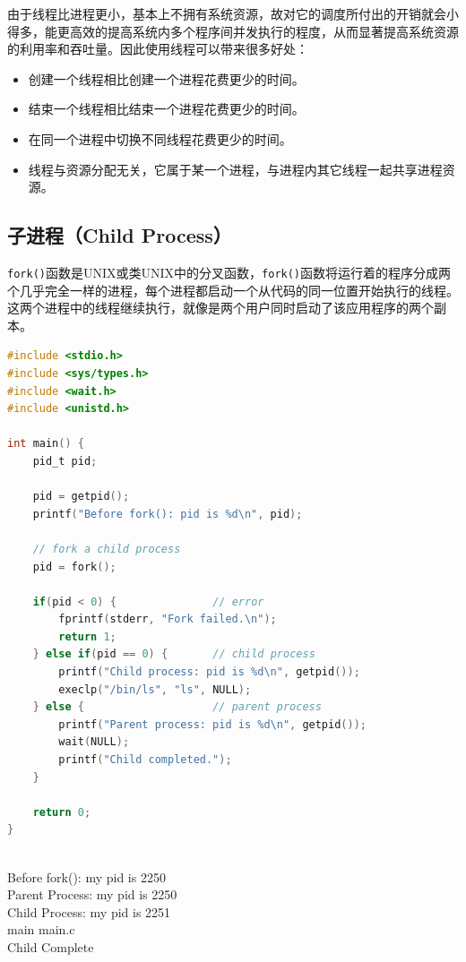 由于线程比进程更小，基本上不拥有系统资源，故对它的调度所付出的开销就会小得多，能更高效的提高系统内多个程序间并发执行的程度，从而显著提高系统资源的利用率和吞吐量。因此使用线程可以带来很多好处：

\begin{itemize}
	\item 创建一个线程相比创建一个进程花费更少的时间。
	\item 结束一个线程相比结束一个进程花费更少的时间。
	\item 在同一个进程中切换不同线程花费更少的时间。
	\item 线程与资源分配无关，它属于某一个进程，与进程内其它线程一起共享进程资源。
\end{itemize}

\subsection{子进程（Child Process）}

\lstinline|fork()|函数是UNIX或类UNIX中的分叉函数，\lstinline|fork()|函数将运行着的程序分成两个几乎完全一样的进程，每个进程都启动一个从代码的同一位置开始执行的线程。这两个进程中的线程继续执行，就像是两个用户同时启动了该应用程序的两个副本。

\begin{lstlisting}[language=C, title=创建子进程]
#include <stdio.h>
#include <sys/types.h>
#include <wait.h>
#include <unistd.h>

int main() {
	pid_t pid;

	pid = getpid();
	printf("Before fork(): pid is %d\n", pid);

	// fork a child process
	pid = fork();

	if(pid < 0) {               // error
		fprintf(stderr, "Fork failed.\n");
		return 1;
	} else if(pid == 0) {       // child process
		printf("Child process: pid is %d\n", getpid());
		execlp("/bin/ls", "ls", NULL);
	} else {                    // parent process
		printf("Parent process: pid is %d\n", getpid());
		wait(NULL);
		printf("Child completed.");
	}
	
	return 0;
}
\end{lstlisting}

\begin{tcolorbox}
	 \\
	Before fork(): my pid is 2250 \\
	Parent Process: my pid is 2250 \\
	Child Process: my pid is 2251 \\
	main main.c \\
	Child Complete
\end{tcolorbox}

